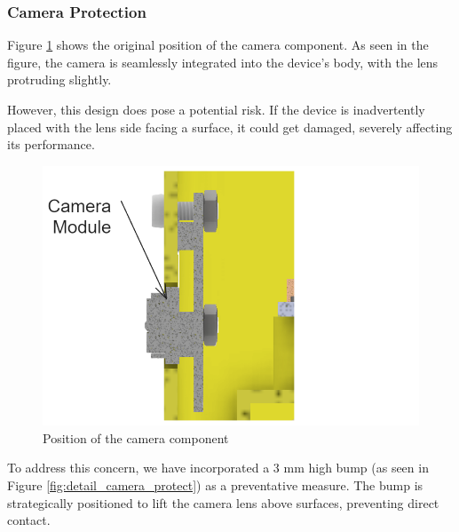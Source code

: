 \subsubsection{Camera Protection}
Figure \ref{fig:camera_position} shows the original position of the camera component. As seen in the figure, the camera is seamlessly integrated into the device's body, with the lens protruding slightly.

However, this design does pose a potential risk. If the device is inadvertently placed with the lens side facing a surface, it could get damaged, severely affecting its performance.

\begin{figure}[!ht]
    \centering
    \includegraphics[height=5 cm]{texs/Part1/chapter4/image/d1.png}
    \caption{Position of the camera component}
    \label{fig:camera_position}
\end{figure}

To address this concern, we have incorporated a 3 mm high bump (as seen in Figure \ref{fig:detail_camera_protect}) as a preventative measure. The bump is strategically positioned to lift the camera lens above surfaces, preventing direct contact.

